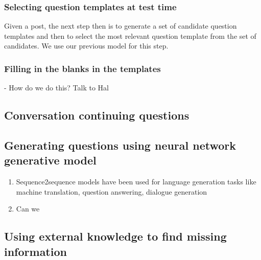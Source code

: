 \documentclass[11pt]{article}
\begin{document}
\subsubsection{Selecting question templates at test time}

Given a post, the next step then is to generate a set of candidate question templates and then to select the most relevant question template from the set of candidates. We use our previous model for this step.

\subsubsection{Filling in the blanks in the templates}

- How do we do this? Talk to Hal

\subsection{Conversation continuing questions}

\subsection{Generating questions using neural network generative model}

\begin{enumerate}
\item Sequence2sequence models have been used for language generation tasks like machine translation, question answering, dialogue generation
\item Can we 
\end{enumerate}

\subsection{Using external knowledge to find missing information}
\end{document}
